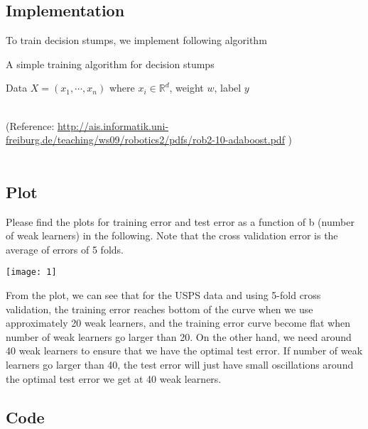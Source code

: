\documentclass[letterpaper,hidelinks]{article}
\numberwithin{equation}{section}
\begin{document}
\subsection{Implementation}
To train decision stumps, we implement following algorithm
\begin{algorithm}
\caption{A simple training algorithm for decision stumps}
\begin{algorithmic}[1]
\REQUIRE
Data $X=(x_1,\cdots,x_n)$ where $x_i\in\mathbb{R}^d$, weight $w$, label $y$
\ENDFOR
{}
\ENDFOR
{}
\end{algorithmic}
\end{algorithm}\\
(Reference: \href{http://ais.informatik.uni-freiburg.de/teaching/ws09/robotics2/pdfs/rob2-10-adaboost.pdf}{http://ais.informatik.uni-freiburg.de/teaching/ws09/robotics2/pdfs/rob2-10-adaboost.pdf} )\\\\

\subsection{Plot}
Please find the plots for training error and test error as a function of b (number of weak learners) in the following. Note that the cross validation error is the average of errors of 5 folds.
\begin{center}
\texttt{[image: 1]}
\end{center}
From the plot, we can see that for the USPS data and using 5-fold cross validation, the training error reaches bottom of the curve when we use approximately 20 weak learners, and the training error curve become flat when number of weak learners go larger than 20. On the other hand, we need around 40 weak learners to ensure that we have the optimal test error. If number of weak learners go larger than 40, the test error will just have small oscillations around the optimal test error we get at 40 weak learners.

\subsection{Code}

\end{document}
